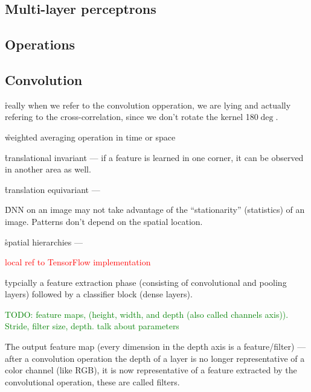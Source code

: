 
\subsection{Multi-layer perceptrons}


\subsection{Operations}

\subsection{Convolution}



\r{really when we refer to the convolution opperation, we are lying and actually refering to the cross-correlation, since we don't rotate the kernel 180$\deg$.}


\r{weighted averaging operation in time or space}

\r{translational invariant --- if a feature is learned in one corner, it can be observed in another area as well.}

\r{translation equivariant --- }

\r{DNN on an image may not take advantage of the ``stationarity'' (statistics) of an image. Patterns don't depend on the spatial location.}

\r{spatial hierarchies --- }

\textcolor{red}{local ref to TensorFlow implementation}

\r{typcially a feature extraction phase (consisting of convolutional and pooling layers) followed by a classifier block (dense layers).}

\textcolor{green}{TODO: feature maps, (height, width, and depth (also called channels axis)). Stride, filter size, depth. talk about parameters}

\r{The output feature map (every dimension in the depth axis is a feature/filter) --- after a convolution operation the depth of a layer is no longer representative of a color channel (like RGB), it is now representative of a feature extracted by the convolutional operation, these are called filters.}

